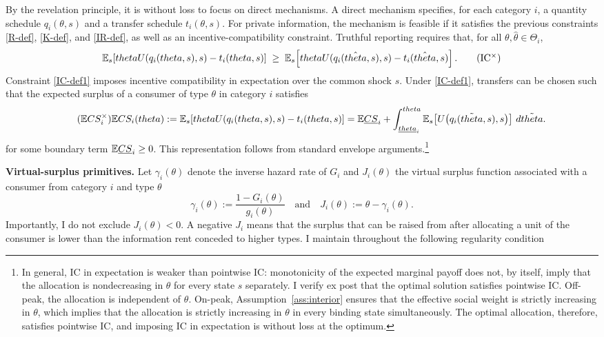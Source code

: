 \documentclass{class}
\begin{document}
By the revelation principle, it is without loss to focus on direct mechanisms. A direct mechanism specifies, for each category $i$, a quantity schedule $q_i(\theta,s)$ and a transfer schedule $t_i(\theta,s)$. For private information, the mechanism is feasible if it satisfies the previous constraints \ref{R-def}, \ref{K-def}, and \ref{IR-def}, as well as an incentive-compatibility constraint. Truthful reporting requires that, for all $\theta,\hat\theta \in \Theta_i$, 
\[
\mathbb{E}_s\!\left[theta U(q_i(theta,s),s) - t_i(theta,s)\right] \;\ge\; \mathbb{E}_s\!\left[theta U(q_i(\hat{theta},s),s) - t_i(\hat{theta},s)\right].
\tag{IC$^\times$}\label{IC-def1}
\] 
Constraint \ref{IC-def1} imposes incentive compatibility in expectation over the common shock $s$. Under \ref{IC-def1}, transfers can be chosen such that the expected surplus of a consumer of type $\theta$ in category $i$ satisfies 
\[ \tag{$\E CS_i^\times$}\label{ECSi} \E CS_i(\theta):=\E_s\!\left[\theta U\!\left(q_i(\theta,s),s\right)-t_i(\theta,s)\right] = \E \underline{CS}_i+\int_{\underline{\theta}_i}^{\theta}\E_s\!\left[U\!\left(q_i(\tilde{\theta},s),s\right)\right]\,d\tilde{\theta}. \]
for some boundary term $\mathbb{E} \underline{CS}_i \ge 0$. This representation follows from standard envelope arguments.\footnote{In general, IC in expectation is weaker than pointwise IC: monotonicity of the expected marginal payoff does not, by itself, imply that the allocation is nondecreasing in $\theta$ for every state $s$ separately. I verify ex post that the optimal solution satisfies pointwise IC. Off-peak, the allocation is independent of $\theta$. On-peak, Assumption~\ref{ass:interior} ensures that the effective social weight is strictly increasing in $\theta$, which implies that the allocation is strictly increasing in $\theta$ in every binding state simultaneously. The optimal allocation, therefore, satisfies pointwise IC, and imposing IC in expectation is without loss at the optimum.} 

\noindent\textbf{Virtual-surplus primitives.} Let $\gamma_i(\theta)$ denote the inverse hazard rate of $G_i$ and $J_i(\theta)$ the virtual surplus function associated with a consumer from category $i$ and type $\theta$
\[
\gamma_i(\theta):= \frac{1-G_i(\theta)}{g_i(\theta)} \quad \text{and} \quad  J_i(\theta):=\theta - \gamma_i(\theta).
\]
Importantly, I do not exclude $J_i(\theta) < 0$. A negative $J_i$ means that the surplus that can be raised from after allocating a unit of the consumer is lower than the information rent conceded to higher types. I maintain throughout the following regularity condition
\end{document}
